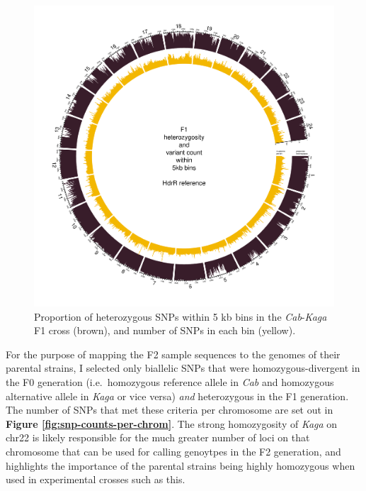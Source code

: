 \documentclass[
]{book}
\begin{document}
\begin{figure}
\includegraphics[width=1\linewidth]{figs/somites/F1} \caption{Proportion of heterozygous SNPs within 5 kb bins in the \emph{Cab}-\emph{Kaga} F1 cross (brown), and number of SNPs in each bin (yellow).}\label{fig:somite-f1}
\end{figure}

For the purpose of mapping the F2 sample sequences to the genomes of their parental strains, I selected only biallelic SNPs that were homozygous-divergent in the F0 generation (i.e.~homozygous reference allele in \emph{Cab} and homozygous alternative allele in \emph{Kaga} or vice versa) \emph{and} heterozygous in the F1 generation. The number of SNPs that met these criteria per chromosome are set out in \textbf{Figure \ref{fig:snp-counts-per-chrom}}. The strong homozygosity of \emph{Kaga} on chr22 is likely responsible for the much greater number of loci on that chromosome that can be used for calling genoytpes in the F2 generation, and highlights the importance of the parental strains being highly homozygous when used in experimental crosses such as this.
\end{document}
